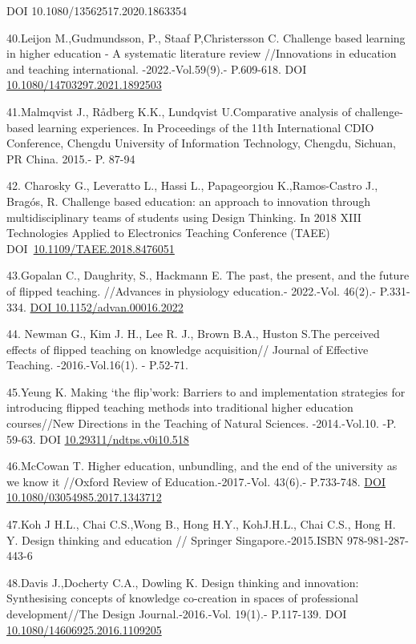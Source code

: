 DOI 10.1080/13562517.2020.1863354

40.Leijon M.,Gudmundsson, P., Staaf P,Christersson C. Challenge based
learning in higher education - A systematic literature review
//Innovations in education and teaching international.
-2022.-Vol.59(9).- P.609-618. DOI
\href{http://dx.doi.org/10.1080/14703297.2021.1892503}{10.1080/14703297.2021.1892503}

41.Malmqvist J., Rådberg K.K., Lundqvist U.Comparative analysis of
challenge-based learning experiences. In Proceedings of the 11th
International CDIO Conference, Chengdu University of Information
Technology, Chengdu, Sichuan, PR China. 2015.- P. 87-94

42. Charosky G., Leveratto L., Hassi L., Papageorgiou K.,Ramos-Castro
J., Bragós, R. Challenge based education: an approach to innovation
through multidisciplinary teams of students using Design Thinking. In
2018 XIII Technologies Applied to Electronics Teaching Conference (TAEE)
DOI~\href{https://doi.org/10.1109/TAEE.2018.8476051}{10.1109/TAEE.2018.8476051}

43.Gopalan C., Daughrity, S., Hackmann E. The past, the present, and the
future of flipped teaching. //Advances in physiology education.-
2022.-Vol. 46(2).- P.331-334.
\href{https://doi.org/10.1152/advan.00016.2022}{DOI
10.1152/advan.00016.2022}

44. Newman G., Kim J. H., Lee R. J., Brown B.A., Huston S.The perceived
effects of flipped teaching on knowledge acquisition// Journal of
Effective Teaching. -2016.-Vol.16(1). - P.52-71.

45.Yeung K. Making `the flip'work: Barriers to and implementation
strategies for introducing flipped teaching methods into traditional
higher education courses//New Directions in the Teaching of Natural
Sciences. -2014.-Vol.10. -P. 59-63. DOI
\href{https://doi.org/10.29311/ndtps.v0i10.518}{10.29311/ndtps.v0i10.518}

46.McCowan T. Higher education, unbundling, and the end of the
university as we know it //Oxford Review of Education.-2017.-Vol.
43(6).- P.733-748.
\href{https://doi.org/10.1080/03054985.2017.1343712}{DOI
10.1080/03054985.2017.1343712}

47.Koh J H.L., Chai C.S.,Wong B., Hong H.Y., KohJ.H.L., Chai C.S., Hong
H. Y. Design thinking and education // Springer Singapore.-2015.ISBN
978-981-287-443-6

48.Davis J.,Docherty C.A., Dowling K. Design thinking and innovation:
Synthesising concepts of knowledge co-creation in spaces of professional
development//The Design Journal.-2016.-Vol. 19(1).- P.117-139. DOI
\href{http://dx.doi.org/10.1080/14606925.2016.1109205}{10.1080/14606925.2016.1109205}


